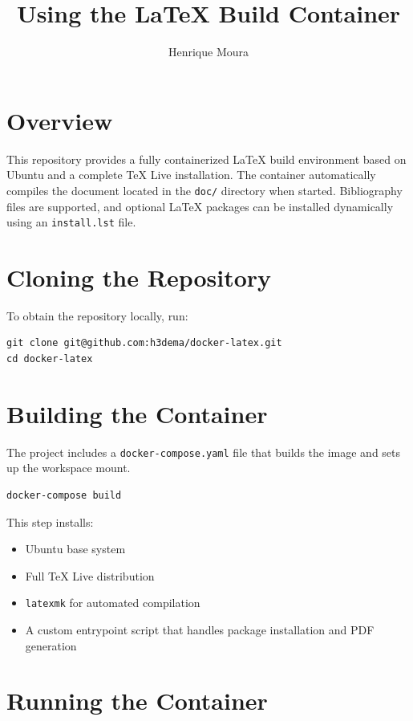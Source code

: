 \documentclass[11pt,a4paper]{article}
\title{Using the LaTeX Build Container}
\author{Henrique Moura}
\begin{document}
\maketitle

\section{Overview}

This repository provides a fully containerized LaTeX build environment based on Ubuntu and a complete TeX Live installation. The container automatically compiles the document located in the \texttt{doc/} directory when started. Bibliography files are supported, and optional LaTeX packages can be installed dynamically using an \texttt{install.lst} file.

\section{Cloning the Repository}

To obtain the repository locally, run:

\begin{verbatim}
git clone git@github.com:h3dema/docker-latex.git
cd docker-latex
\end{verbatim}


\section{Building the Container}

The project includes a \texttt{docker-compose.yaml} file that builds the image and sets up the workspace mount.

\begin{verbatim}
docker-compose build
\end{verbatim}

This step installs:
\begin{itemize}
    \item Ubuntu base system
    \item Full TeX Live distribution
    \item \texttt{latexmk} for automated compilation
    \item A custom entrypoint script that handles package installation and PDF generation
\end{itemize}

\section{Running the Container}
\end{document}
